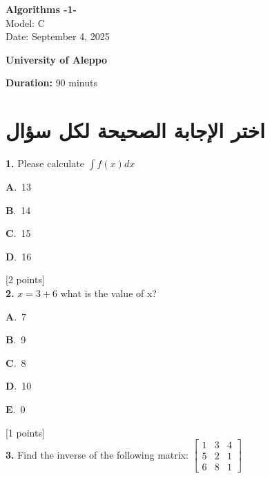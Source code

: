 \documentclass[12pt]{article}
\newcommand{\choice}[3]{%
  \noindent\textbf{#1}.~#2\hfill#3\par\vspace{0.25em}
}
\begin{document}
\begin{flushright}
{\Large \textbf{{\textenglish{Algorithms -1-}}}}\\[0.25em]
{\normalsize \textenglish{Model: }{\textenglish{C}}}\\[0.1em]
{\normalsize \textenglish{Date: }{\textenglish{September 4, 2025}}}
\end{flushright}

\vspace{0.6cm}

\noindent
\begin{minipage}[t]{0.65\textwidth}
  \raggedright
  \textbf{{\textenglish{University of Aleppo}}}\\[0.3em]
\end{minipage}\hfill
\begin{minipage}[t]{0.3\textwidth}
  \raggedleft
  \textenglish{\textbf{Duration: }}{\textenglish{90 minuts}}
\end{minipage}

\vspace{0.9cm}

\section*{اختر الإجابة الصحيحة لكل سؤال}

\noindent \textbf{\textenglish{1.}} {\textenglish{Please calculate }}\(\int f(x)dx\)

\noindent\choice{A}{{\textenglish{13}}}{}
\noindent\choice{B}{{\textenglish{14}}}{}
\noindent\choice{C}{{\textenglish{15}}}{}
\noindent\choice{D}{{\textenglish{16}}}{}
\hfill {\textenglish{[2 points]}}\\[0.5em]

\noindent \textbf{\textenglish{2.}} \(x=3+6 \){\textenglish{ what is the value of x?}}

\noindent\choice{A}{{\textenglish{7}}}{}
\noindent\choice{B}{{\textenglish{9}}}{}
\noindent\choice{C}{{\textenglish{8}}}{}
\noindent\choice{D}{{\textenglish{10}}}{}
\noindent\choice{E}{{\textenglish{0}}}{}
\hfill {\textenglish{[1 points]}}\\[0.5em]

\noindent \textbf{\textenglish{3.}} {\textenglish{Find the inverse of the following matrix: }}\(\begin{bmatrix} 1 & 3 & 4 \\ 5 & 2 & 1 \\ 6 & 8 & 1 \end{bmatrix}\)
\end{document}
